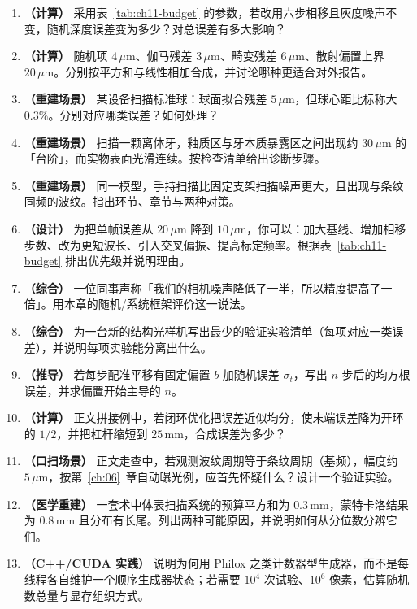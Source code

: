 \begin{enumerate}
  \item \textbf{（计算）} 采用表~\ref{tab:ch11-budget} 的参数，若改用六步相移且灰度噪声不变，随机深度误差变为多少？对总误差有多大影响？
  \item \textbf{（计算）} 随机项 $4\,\mu\mathrm{m}$、伽马残差 $3\,\mu\mathrm{m}$、畸变残差 $6\,\mu\mathrm{m}$、散射偏置上界 $20\,\mu\mathrm{m}$。分别按平方和与线性相加合成，并讨论哪种更适合对外报告。
  \item \textbf{（重建场景）} 某设备扫描标准球：球面拟合残差 $5\,\mu\mathrm{m}$，但球心距比标称大 $0.3\%$。分别对应哪类误差？如何处理？
  \item \textbf{（重建场景）} 扫描一颗离体牙，釉质区与牙本质暴露区之间出现约 $30\,\mu\mathrm{m}$ 的「台阶」，而实物表面光滑连续。按检查清单给出诊断步骤。
  \item \textbf{（重建场景）} 同一模型，手持扫描比固定支架扫描噪声更大，且出现与条纹同频的波纹。指出环节、章节与两种对策。
  \item \textbf{（设计）} 为把单帧误差从 $20\,\mu\mathrm{m}$ 降到 $10\,\mu\mathrm{m}$，你可以：加大基线、增加相移步数、改为更短波长、引入交叉偏振、提高标定频率。根据表~\ref{tab:ch11-budget} 排出优先级并说明理由。
  \item \textbf{（综合）} 一位同事声称「我们的相机噪声降低了一半，所以精度提高了一倍」。用本章的随机/系统框架评价这一说法。
  \item \textbf{（综合）} 为一台新的结构光样机写出最少的验证实验清单（每项对应一类误差），并说明每项实验能分离出什么。
  \item \textbf{（推导）} 若每步配准平移有固定偏置 $b$ 加随机误差 $\sigma_t$，写出 $n$ 步后的均方根误差，并求偏置开始主导的 $n$。
  \item \textbf{（计算）} 正文拼接例中，若闭环优化把误差近似均分，使末端误差降为开环的 $1/2$，并把杠杆缩短到 $25\,\mathrm{mm}$，合成误差为多少？
  \item \textbf{（口扫场景）} 正文走查中，若观测波纹周期等于条纹周期（基频），幅度约 $5\,\mu\mathrm{m}$，按第~\ref{ch:06}~章自动曝光例，应首先怀疑什么？设计一个验证实验。
  \item \textbf{（医学重建）} 一套术中体表扫描系统的预算平方和为 $0.3\,\mathrm{mm}$，蒙特卡洛结果为 $0.8\,\mathrm{mm}$ 且分布有长尾。列出两种可能原因，并说明如何从分位数分辨它们。
  \item \textbf{（C++/CUDA 实践）} 说明为何用 Philox 之类计数器型生成器，而不是每线程各自维护一个顺序生成器状态；若需要 $10^4$ 次试验、$10^6$ 像素，估算随机数总量与显存组织方式。
\end{enumerate}

